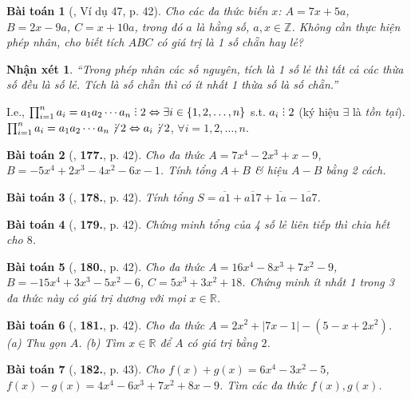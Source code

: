 \documentclass{article}
\numberwithin{equation}{section}
\newtheorem{baitoan}{Bài toán}
\newtheorem{nhanxet}{Nhận xét}[section]
\DeclareRobustCommand{\divby}{%
	\mathrel{\vbox{\baselineskip.65ex\lineskiplimit0pt\hbox{.}\hbox{.}\hbox{.}}}%
}
\begin{document}
\begin{baitoan}[\cite{Tuyen_Toan_7}, Ví dụ 47, p. 42]
	Cho các đa thức biến $x$: $A = 7x + 5a$, $B = 2x - 9a$, $C = x + 10a$, trong đó $a$ là hằng số, $a,x\in\mathbb{Z}$. Không cần thực hiện phép nhân, cho biết tích $ABC$ có giá trị là 1 số chẵn hay lẻ?
\end{baitoan}

\begin{nhanxet}
	``Trong phép nhân các số nguyên, tích là 1 số lẻ thì tất cả các thừa số đều là số lẻ. Tích là số chẵn thì có ít nhất 1 thừa số là số chẵn.''
\end{nhanxet}
I.e., $\prod_{i=1}^n a_i = a_1a_2\cdots a_n\divby2\Leftrightarrow\exists i\in\{1,2,\ldots,n\}$ s.t. $a_i\divby2$ (ký hiệu $\exists$ là \textit{tồn tại}). $\prod_{i=1}^n a_i = a_1a_2\cdots a_n\not\,\divby2\Leftrightarrow a_i\not\,\divby2$, $\forall i = 1,2,\ldots,n$.

\begin{baitoan}[\cite{Tuyen_Toan_7}, \textbf{177.}, p. 42]
	Cho đa thức $A = 7x^4 - 2x^3 + x - 9$, $B = -5x^4 + 2x^3 - 4x^2 - 6x - 1$. Tính tổng $A + B$ \& hiệu $A - B$ bằng 2 cách.
\end{baitoan}

\begin{baitoan}[\cite{Tuyen_Toan_7}, \textbf{178.}, p. 42]
	Tính tổng $S = \overline{a1} + \overline{a17} + \overline{1a} - \overline{1a7}$.
\end{baitoan}

\begin{baitoan}[\cite{Tuyen_Toan_7}, \textbf{179.}, p. 42]
	Chứng minh tổng của 4 số lẻ liên tiếp thì chia hết cho $8$.
\end{baitoan}

\begin{baitoan}[\cite{Tuyen_Toan_7}, \textbf{180.}, p. 42]
	Cho đa thức $A = 16x^4 - 8x^3 + 7x^2 - 9$, $B = -15x^4 + 3x^3 - 5x^2 - 6$, $C = 5x^3 + 3x^2 + 18$. Chứng minh ít nhất 1 trong 3 đa thức này có giá trị dương với mọi $x\in\mathbb{R}$.
\end{baitoan}

\begin{baitoan}[\cite{Tuyen_Toan_7}, \textbf{181.}, p. 42]
	Cho đa thức $A = 2x^2 + |7x - 1| - (5 - x + 2x^2)$. (a) Thu gọn $A$. (b) Tìm $x\in\mathbb{R}$ để $A$ có giá trị bằng $2$.
\end{baitoan}

\begin{baitoan}[\cite{Tuyen_Toan_7}, \textbf{182.}, p. 43]
	Cho $f(x) + g(x) = 6x^4 - 3x^2 - 5$, $f(x) - g(x) = 4x^4 - 6x^3 + 7x^2 + 8x - 9$. Tìm các đa thức $f(x),g(x)$.
\end{baitoan}
\end{document}
